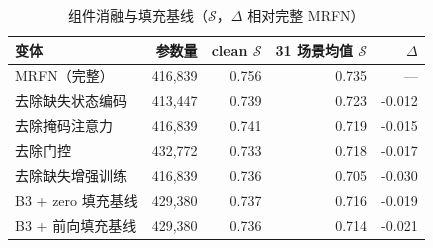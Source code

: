 \begin{table}[htbp]
  \centering
  \caption{组件消融与填充基线（$\mathcal{S}$，$\Delta$ 相对完整 MRFN）}
  \label{tab:p2-ablation}
  \begin{tabularx}{\textwidth}{@{}Xrrrr@{}}
    \toprule
    变体 & 参数量 & clean $\mathcal{S}$ & 31 场景均值 $\mathcal{S}$ & $\Delta$ \\
    \midrule
    MRFN（完整） & 416,839 & 0.756 & 0.735 & — \\
    去除缺失状态编码 & 413,447 & 0.739 & 0.723 & -0.012 \\
    去除掩码注意力 & 416,839 & 0.741 & 0.719 & -0.015 \\
    去除门控 & 432,772 & 0.733 & 0.718 & -0.017 \\
    去除缺失增强训练 & 416,839 & 0.736 & 0.705 & -0.030 \\
    B3 + zero 填充基线 & 429,380 & 0.737 & 0.716 & -0.019 \\
    B3 + 前向填充基线 & 429,380 & 0.736 & 0.714 & -0.021 \\
    \bottomrule
  \end{tabularx}
  \par \smallskip
  \end{table}